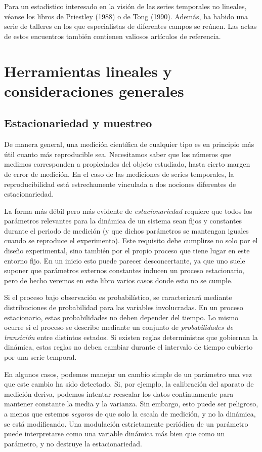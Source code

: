 \documentclass[10pt,a4paper]{book}
\begin{document}
Para un estadístico interesado en la visión de las series temporales no lineales, véanse los libros de Priestley (1988) o de Tong (1990). Además, ha habido una serie de talleres en los que especialistas de diferentes campos se reúnen. Las actas de estos encuentros también contienen valiosos artículos de referencia.

\newpage
\chapter{Herramientas lineales y consideraciones generales}

\section{Estacionariedad y muestreo}

De manera general, una medición científica de cualquier tipo es en principio más útil cuanto más reproducible sea. Necesitamos saber que los números que medimos corresponden a propiedades del objeto estudiado, hasta cierto margen de error de medición. En el caso de las mediciones de series temporales, la reproducibilidad está estrechamente vinculada a dos nociones diferentes de estacionariedad.

La forma más débil pero más evidente de \emph{estacionariedad} requiere que todos los parámetros relevantes para la dinámica de un sistema sean fijos y constantes durante el periodo de medición (y que dichos parámetros se mantengan iguales cuando se reproduce el experimento). Este requisito debe cumplirse no solo por el diseño experimental, sino también por el propio proceso que tiene lugar en este entorno fijo. En un inicio esto puede parecer desconcertante, ya que uno suele suponer que parámetros externos constantes inducen un proceso estacionario, pero de hecho veremos en este libro varios casos donde esto no se cumple.  

Si el proceso bajo observación es probabilístico, se caracterizará mediante distribuciones de probabilidad para las variables involucradas. En un proceso estacionario, estas probabilidades no deben depender del tiempo. Lo mismo ocurre si el proceso se describe mediante un conjunto de \emph{probabilidades de transición} entre distintos estados. Si existen reglas deterministas que gobiernan la dinámica, estas reglas no deben cambiar durante el intervalo de tiempo cubierto por una serie temporal.

En algunos casos, podemos manejar un cambio simple de un parámetro una vez que este cambio ha sido detectado. Si, por ejemplo, la calibración del aparato de medición deriva, podemos intentar reescalar los datos continuamente para mantener constante la media y la varianza. Sin embargo, esto puede ser peligroso, a menos que estemos \emph{seguros} de que solo la escala de medición, y no la dinámica, se está modificando. Una modulación estrictamente periódica de un parámetro puede interpretarse como una variable dinámica más bien que como un parámetro, y no destruye la estacionariedad.
\end{document}
